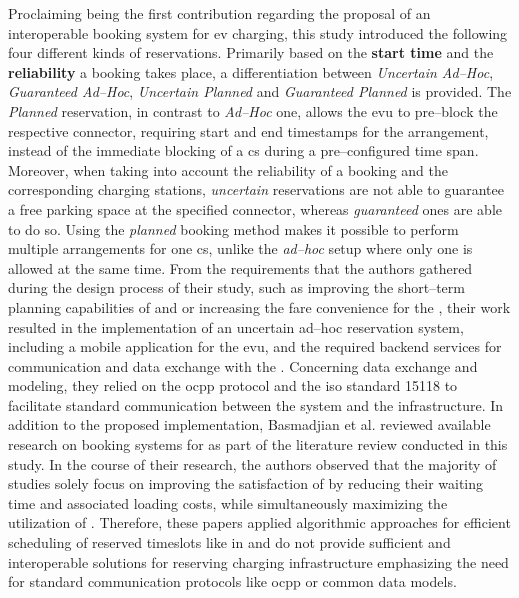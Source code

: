 Proclaiming being the first contribution regarding the proposal of an interoperable booking system for \acrshort{ev} charging, this study introduced the following four different kinds of reservations. Primarily based on the \textbf{start time} and the \textbf{reliability} a booking takes place, a differentiation between \textit{Uncertain Ad--Hoc}, \textit{Guaranteed Ad--Hoc}, \textit{Uncertain Planned} and \textit{Guaranteed Planned} is provided.
The \textit{Planned} reservation, in contrast to \textit{Ad--Hoc} one, allows the \acrshort{evu} to pre--block the respective connector, requiring start and end timestamps for the arrangement, instead of the immediate blocking of a \acrshort{cs} during a pre--configured time span. 
Moreover, when taking into account the reliability of a booking and the corresponding charging stations, \textit{uncertain} reservations are not able to guarantee a free parking space at the specified connector, whereas \textit{guaranteed} ones are able to do so.
Using the \textit{planned} booking method makes it possible to perform multiple arrangements for one \acrshort{cs}, unlike the \textit{ad--hoc} setup where only one is allowed at the same time.
From the requirements that the authors gathered during the design process of their study, such as improving the short--term planning capabilities of  and  or increasing the fare convenience for the , their work resulted in the implementation of an uncertain ad--hoc reservation system, including a mobile application for the \acrshort{evu}, and the required backend services for communication and data exchange with the .
Concerning data exchange and modeling, they relied on the \acrshort{ocpp} protocol and the \acrshort{iso} standard 15118 to facilitate standard communication between the system and the infrastructure.
In addition to the proposed implementation, Basmadjian et al. reviewed available research on booking systems for  as part of the literature review conducted in this study.
In the course of their research, the authors observed that the majority of studies solely focus on improving the satisfaction of  by reducing their waiting time and associated loading costs, while simultaneously maximizing the utilization of .
Therefore, these papers applied algorithmic approaches for efficient scheduling of reserved timeslots like in \cite{kim_efficient_2010,xiang_reservation-based_2011,qin_charging_2011} and do not provide sufficient and interoperable solutions for reserving charging infrastructure emphasizing the need for standard communication protocols like \acrshort{ocpp} or common data models. 
